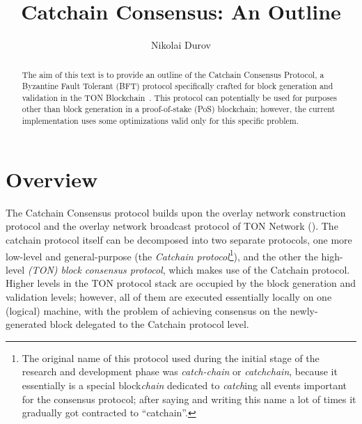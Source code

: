 \documentclass[12pt,oneside]{article}
\title{Catchain Consensus: An Outline}
\author{Nikolai Durov}
\def\mysection#1{\section{#1}\fancyhead[C]{\textsc{Chapter \textbf{\thesection.} #1}}}
\begin{document}
\maketitle

\begin{abstract}
  The aim of this text is to provide an outline of the Catchain Consensus Protocol, a Byzantine Fault Tolerant (BFT) protocol specifically crafted for block generation and validation in the TON Blockchain~\cite{TON}. This protocol can potentially be used for purposes other than block generation in a proof-of-stake (PoS) blockchain; however, the current implementation uses some optimizations valid only for this specific problem.
\end{abstract}

\tableofcontents
\clearpage

\mysection{Overview}\label{sect:overview}
The Catchain Consensus protocol builds upon the overlay network construction protocol and the overlay network broadcast protocol of TON Network (\cite{TON}). The catchain protocol itself can be decomposed into two separate protocols, one more low-level and general-purpose (the {\em Catchain protocol\/}\footnote{The original name of this protocol used during the initial stage of the research and development phase was {\em catch-chain} or {\em catchchain}, because it essentially is a special block{\em chain} dedicated to {\em catch\/}ing all events important for the consensus protocol; after saying and writing this name a lot of times it gradually got contracted to ``catchain''.}), and the other the high-level {\em (TON) block consensus protocol}, which makes use of the Catchain protocol. Higher levels in the TON protocol stack are occupied by the block generation and validation levels; however, all of them are executed essentially locally on one (logical) machine, with the problem of achieving consensus on the newly-generated block delegated to the Catchain protocol level.
\end{document}
